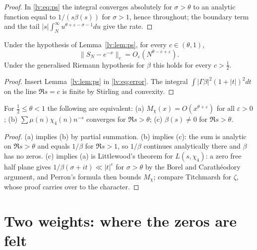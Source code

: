 \begin{proof}
In \eqref{lv:eq:ps} the integral converges absolutely for $\sigma>\theta$ to an analytic function equal to $1/(s\beta(s))$ for $\sigma>1$, hence throughout; the boundary term and the tail $|s|\int_N^\infty u^{\theta+\varepsilon-\sigma-1}du$ give the rate.
\end{proof}

\begin{theorem}\label{lv:thm:strip}
Under the hypothesis of Lemma~\ref{lv:lem:ps}, for every $c\in(\theta,1)$,
\[
\|S_N-e^{-x}\|_c=O_\varepsilon(N^{\theta-c+\varepsilon}).
\]
Under the generalised Riemann hypothesis for $\beta$ this holds for every $c>\frac12$.
\end{theorem}

\begin{proof}
Insert Lemma~\ref{lv:lem:ps} in \eqref{lv:eq:error}. The integral $\int|\Gamma\beta|^2(1+|t|)^2dt$ on the line $\Re s=c$ is finite by Stirling and convexity.
\end{proof}

\begin{proposition}\label{lv:prop:classical}
For $\frac12\le\theta<1$ the following are equivalent: (a) $M_\chi(x)=O(x^{\theta+\varepsilon})$ for all $\varepsilon>0$; (b) $\sum\mu(n)\chi_4(n)n^{-s}$ converges for $\Re s>\theta$; (c) $\beta(s)\ne0$ for $\Re s>\theta$.
\end{proposition}

\begin{proof}
(a) implies (b) by partial summation. (b) implies (c): the sum is analytic on $\Re s>\theta$ and equals $1/\beta$ for $\Re s>1$, so $1/\beta$ continues analytically there and $\beta$ has no zeros. (c) implies (a) is Littlewood's theorem for $L(s,\chi_4)$: a zero free half plane gives $1/\beta(\sigma+it)\ll|t|^{\varepsilon}$ for $\sigma>\theta$ by the Borel and Carath\'eodory argument, and Perron's formula then bounds $M_\chi$; compare Titchmarsh \cite[Section 14.25]{Titchmarsh} for $\zeta$, whose proof carries over to the character.
\end{proof}

\section{Two weights: where the zeros are felt}\label{lv:sec:two}

